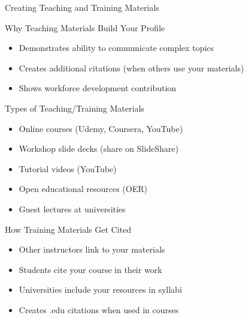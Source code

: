 \documentclass[11pt]{beamer}
\begin{document}
				\begin{frame}{Creating Teaching and Training Materials}
					\scriptsize
					\begin{block}{Why Teaching Materials Build Your Profile}
						\begin{itemize}
							\item Demonstrates ability to communicate complex topics
							\item Creates additional citations (when others use your materials)
							\item Shows workforce development contribution
						\end{itemize}
					\end{block}
					\begin{block}{Types of Teaching/Training Materials}
						\begin{itemize}
							\item Online courses (Udemy, Coursera, YouTube)
							\item Workshop slide decks (share on SlideShare)
							\item Tutorial videos (YouTube)
							\item Open educational resources (OER)
							\item Guest lectures at universities
						\end{itemize}
					\end{block}
					\begin{block}{How Training Materials Get Cited}
						\begin{itemize}
							\item Other instructors link to your materials
							\item Students cite your course in their work
							\item Universities include your resources in syllabi
							\item Creates .edu citations when used in courses
						\end{itemize}
					\end{block}
				\end{frame}
				
\end{document}

